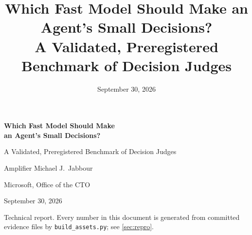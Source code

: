 \documentclass[11pt,letterpaper]{article}
\title{Which Fast Model Should Make an Agent's Small Decisions?\\[4pt]
\large A Validated, Preregistered Benchmark of Decision Judges}
\date{September 30, 2026}
\newcommand{\code}[1]{\texttt{#1}}
\begin{document}
\begin{titlepage}
  \centering
  \vspace*{1.2in}
  {\LARGE\bfseries Which Fast Model Should Make\\[2pt] an Agent's Small Decisions?\par}
  \vspace{10pt}
  {\Large A Validated, Preregistered Benchmark of Decision Judges\par}
  \vspace{36pt}
  {\large Amplifier \qquad Michael J.\ Jabbour\par}
  \vspace{6pt}
  {\normalsize Microsoft, Office of the CTO\par}
  \vspace{18pt}
  {\normalsize September 30, 2026\par}
  \vspace{40pt}
  \begin{minipage}{0.86\textwidth}
    
  \end{minipage}
  \vfill
  {\small Technical report. Every number in this document is generated from committed evidence files by
  \code{build\_assets.py}; see \cref{sec:repro}.\par}
\end{titlepage}

\setcounter{tocdepth}{1}
\tableofcontents
\clearpage














\appendix



\end{document}
